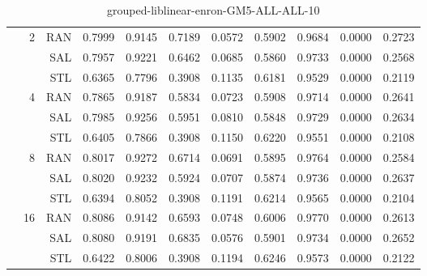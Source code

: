 \begin{center}
\begin{table}[htbp]
\begin{center}
\begin{tabular}{ | r | r | r | r | r | r | r | r | r | r | r |}
 & \multirow{3}{*}{2} & RAN & 0.7999 & 0.9145 & 0.7189 & 0.0572 & 0.5902 & 0.9684 & 0.0000 & 0.2723\\ \cline{3-11}
 &   & SAL & 0.7957 & 0.9221 & 0.6462 & 0.0685 & 0.5860 & 0.9733 & 0.0000 & 0.2568\\ \cline{3-11}
 &   & STL & 0.6365 & 0.7796 & 0.3908 & 0.1135 & 0.6181 & 0.9529 & 0.0000 & 0.2119\\ \cline{2-11}
 & \multirow{3}{*}{4} & RAN & 0.7865 & 0.9187 & 0.5834 & 0.0723 & 0.5908 & 0.9714 & 0.0000 & 0.2641\\ \cline{3-11}
 &   & SAL & 0.7985 & 0.9256 & 0.5951 & 0.0810 & 0.5848 & 0.9729 & 0.0000 & 0.2634\\ \cline{3-11}
 &   & STL & 0.6405 & 0.7866 & 0.3908 & 0.1150 & 0.6220 & 0.9551 & 0.0000 & 0.2108\\ \cline{2-11}
 & \multirow{3}{*}{8} & RAN & 0.8017 & 0.9272 & 0.6714 & 0.0691 & 0.5895 & 0.9764 & 0.0000 & 0.2584\\ \cline{3-11}
 &   & SAL & 0.8020 & 0.9232 & 0.5924 & 0.0707 & 0.5874 & 0.9736 & 0.0000 & 0.2637\\ \cline{3-11}
 &   & STL & 0.6394 & 0.8052 & 0.3908 & 0.1191 & 0.6214 & 0.9565 & 0.0000 & 0.2104\\ \cline{2-11}
 & \multirow{3}{*}{16} & RAN & 0.8086 & 0.9142 & 0.6593 & 0.0748 & 0.6006 & 0.9770 & 0.0000 & 0.2613\\ \cline{3-11}
 &   & SAL & 0.8080 & 0.9191 & 0.6835 & 0.0576 & 0.5901 & 0.9734 & 0.0000 & 0.2652\\ \cline{3-11}
 &   & STL & 0.6422 & 0.8006 & 0.3908 & 0.1194 & 0.6246 & 0.9573 & 0.0000 & 0.2122\\ \cline{2-11}
\hline
\end{tabular}
\caption{grouped-liblinear-enron-GM5-ALL-ALL-10}
\end{center}
 \end{table}
\end{center}


